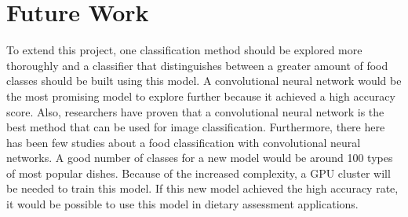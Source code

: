 \section{Future Work}

To extend this project, one classification method should be explored more thoroughly and a classifier that distinguishes between a greater amount of food classes should be built using this model.   A convolutional neural network would be the most promising model to explore further because it achieved a high accuracy score. Also, researchers have proven that a convolutional neural network is the best method that can be used for image classification. Furthermore, there here has been few studies about  a food classification with convolutional neural networks.  A good number of classes for a new model would be around 100 types of most popular dishes.  Because of the increased complexity, a GPU cluster will be needed to train this model. If this new model achieved the high accuracy rate, it would be possible to use this model in dietary assessment applications.


